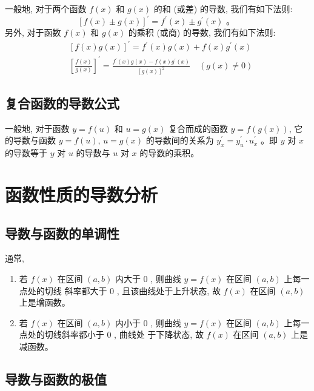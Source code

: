 一般地, 对于两个函数 ${f}({x})$ 和 ${g}({x})$ 的和 (或差) 的导数, 我们有如下法则:
\[
[f(x)\pm g(x)]^{\prime}=f^{\prime}(x)\pm g^{\prime}(x) \text { 。 }
\]
另外, 对于函数 ${f}({x})$ 和 ${g}({x})$ 的乘积 (或商) 的导数, 我们有如下法则:
\[
\begin{aligned}
&{[f(x) g(x)]^{\prime}=f^{\prime}(x) g(x)+f(x) g^{\prime}(x)} \\
&{\left[\frac{f(x)}{g(x)}\right]^{\prime}=\frac{f^{\prime}(x) g(x)-f(x) g^{\prime}(x)}{[g(x)]^{2}} \quad (g(x) \neq 0)}
\end{aligned}
\]


\subsection{复合函数的导数公式}

一般地, 对于函数 ${y}={f}({u})$ 和 $u=g({x})$ 复合而成的函数 ${y}={f}({g}({x}))$, 它的导数与函数 ${y}={f}({u})$, ${u}={g}({x})$ 的导数间的关系为 $y_{x}^{\prime}=y_{u}^{\prime} \cdot  u_{x}^{\prime}$ 。即 ${y}$ 对 ${x}$ 的导数等于 ${y}$ 对 ${u}$ 的导数与 ${u} {}$ 对 ${x}$ 的导数的乘积\cite{章建跃选择性必修二}。



\section{函数性质的导数分析}

\subsection{导数与函数的单调性}

通常, 
\begin{enumerate}[(1)]
  \item 若 ${f}({x})$ 在区间 $(a, b)$ 内大于 0 , 则曲线 ${y}={f}({x})$ 在区间 $(a, b)$ 上每一点处的切线 斜率都大于 0 , 且该曲线处于上升状态, 故 ${f}({x})$ 在区间 $(a, b)$ 上是增函数。
  \item 若 $f(x)$ 在区间 $(a, b)$ 内小于 0 , 则曲线 ${y}={f}({x})$ 在区间 $(a, b)$ 上每一点处的切线斜率都小于 0 , 曲线处 于下降状态, 故 ${f}({x})$ 在区间 $(a, b)$ 上是减函数\cite{高存明选择性必修三}。
\end{enumerate}



\subsection{导数与函数的极值}

